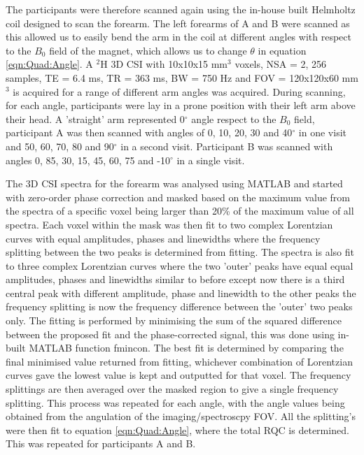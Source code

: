 The participants were therefore scanned again using the in-house built Helmholtz coil designed to scan the forearm. The left forearms of A and B were scanned as this allowed us to easily bend the arm in the coil at different angles with respect to the $B_0$ field of the magnet, which allows us to change $\theta$ in equation \ref{eqn:Quad:Angle}. A $^2$H 3D \ac{CSI} with 10x10x15 mm$^3$ voxels, NSA = 2, 256 samples, \ac{TE} = 6.4 ms, \ac{TR} = 363 ms, \ac{BW} = 750 Hz and \ac{FOV} = 120x120x60 mm$^3$ is acquired for a range of different arm angles was acquired. During scanning, for each angle, participants were lay in a prone position with their left arm above their head. A 'straight' arm represented  0$^{\circ}$ angle respect to the $B_0$ field, participant A was then scanned with angles of 0, 10, 20, 30 and 40$^{\circ}$ in one visit and 50, 60, 70, 80 and 90$^{\circ}$ in a second visit. Participant B was scanned with angles 0, 85, 30, 15, 45, 60, 75 and -10$^{\circ}$ in a single visit. 

The 3D \ac{CSI} spectra for the forearm was analysed using MATLAB and started with zero-order phase correction and masked based on the maximum value from the spectra of a specific voxel being larger than 20\% of the maximum value of all spectra. Each voxel within the mask was then fit to two complex Lorentzian curves with equal amplitudes, phases and linewidths where the frequency splitting between the two peaks is determined from fitting. The spectra is also fit to three complex Lorentzian curves where the two 'outer' peaks have equal equal amplitudes, phases and linewidths similar to before except now there is a third central peak with different amplitude, phase and linewidth to the other peaks the frequency splitting is now the frequency difference between the 'outer' two peaks only. The fitting is performed by minimising the sum of the squared difference between the proposed fit and the phase-corrected signal, this was done using in-built MATLAB function fmincon. The best fit is determined by comparing the final minimised value returned from fitting, whichever combination of Lorentzian curves gave the lowest value is kept and outputted for that voxel. The frequency splittings are then averaged over the masked region to give a single frequency splitting. This process was repeated for each angle, with the angle values being obtained from the angulation of the imaging/spectroscpy \ac{FOV}. All the splitting's were then fit to equation \ref{eqn:Quad:Angle}, where the total \ac{RQC} is determined. This was repeated for participants A and B.


